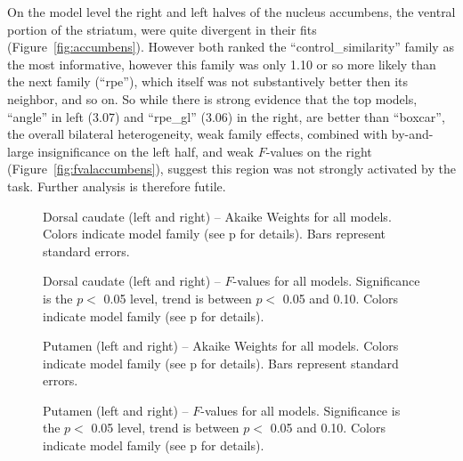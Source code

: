 \documentclass[doc,12pt]{apa}        %
\begin{document}
On the model level the right and left halves of the nucleus accumbens, the ventral portion of the striatum, were quite divergent in their fits (Figure~\ref{fig:accumbens}).  However both ranked the ``control\_similarity'' family as the most informative, however this family was only 1.10 or so more likely than the next family (``rpe''), which itself was not substantively better then its neighbor, and so on.  So while there is strong evidence that the top models, ``angle'' in left (3.07) and ``rpe\_gl'' (3.06) in the right, are better than ``boxcar'', the overall bilateral heterogeneity, weak family effects, combined with by-and-large insignificance on the left half, and weak $F$-values on the right (Figure~\ref{fig:fvalaccumbens}), suggest this region was not strongly activated by the task.  Further analysis is therefore futile.

\begin{figure}[tp]
    \centering
    \caption{Dorsal caudate (left and right) -- Akaike Weights for all models.  Colors indicate model family (see p\pageref{sub:cmb} for details). Bars represent standard errors.}
	\label{fig:caudate}
\end{figure}
\begin{figure}[tp]
    \centering
    \caption{Dorsal caudate (left and right) -- $F$-values for all models.  Significance is the $p <$ 0.05 level, trend is between $p <$ 0.05 and 0.10.  Colors indicate model family (see p\pageref{sub:cmb} for details).}
	\label{fig:fvalcaudate}
\end{figure}

\begin{figure}[tp]
    \centering
    \caption{Putamen (left and right) -- Akaike Weights for all models.  Colors indicate model family (see p\pageref{sub:cmb} for details). Bars represent standard errors.}
	\label{fig:putamen}
\end{figure}
\begin{figure}[tp]
    \centering
    \caption{Putamen (left and right) -- $F$-values for all models.  Significance is the $p <$ 0.05 level, trend is between $p <$ 0.05 and 0.10.  Colors indicate model family (see p\pageref{sub:cmb} for details).}
	\label{fig:fvalputamen}
\end{figure}
\end{document}
